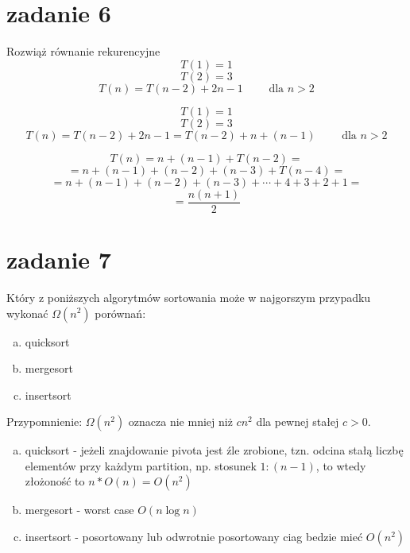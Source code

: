 \documentclass[svgnames]{report}
\begin{document}
\section{zadanie 6}
\begin{framed}
Rozwiąż równanie rekurencyjne
$$ T(1)=1$$
$$ T(2)=3$$
$$ T(n)=T(n-2)+2n-1 \qquad \mbox{ dla $n >2$} $$
\end{framed}
$$ T(1)=1$$
$$ T(2)=3$$
$$ T(n)=T(n-2)+2n-1=T(n-2)+n+(n-1) \qquad \mbox{ dla $n >2$} $$

$$ T(n)=n+(n-1)+T(n-2)=$$
$$ = n+(n-1)+(n-2)+(n-3)+T(n-4)=$$
$$ = n+(n-1)+(n-2)+(n-3)+\cdots+4+3+2+1=$$
$$= \frac {n(n+1)} 2$$


\section{zadanie 7}
\begin{framed}
Który z poniższych algorytmów sortowania może w najgorszym przypadku wykonać $\Omega(n^2)$ porównań:
\begin{enumerate}[a)]
	\item quicksort
	\item mergesort
	\item insertsort
\end{enumerate}
Przypomnienie: $\Omega(n^2)$ oznacza nie mniej niż $cn^2$ dla pewnej stałej $c>0$.
\end{framed}
\begin{enumerate}[a)]
	\item quicksort - jeżeli znajdowanie pivota jest źle zrobione, tzn. odcina stałą liczbę elementów przy każdym partition, np. stosunek $1:(n-1)$, to wtedy złożoność to $n*O(n) = O(n^2)$
	\item mergesort - worst case $O(n\log n)$
	\item insertsort - posortowany lub odwrotnie posortowany ciag bedzie mieć $O(n^2)$
\end{enumerate}

\end{document}
